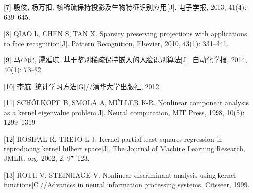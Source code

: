 \documentclass[bachelor,zhspacing]{cqu}  %
\begin{document}
\hypertarget{ref-ux6bb7ux4fca2013ux6838ux7a00ux758fux4fddux6301ux6295ux5f71ux53caux751fux7269ux7279ux5f81ux8bc6ux522bux5e94ux7528}{}
{[}7{]} 殷俊, 杨万扣. 核稀疏保持投影及生物特征识别应用{[}J{]}. 电子学报,
2013, 41(4): 639--645.

\hypertarget{ref-qiao2010sparsity}{}
{[}8{]} QIAO L, CHEN S, TAN X. Sparsity preserving projections with
applications to face recognition{[}J{]}. Pattern Recognition, Elsevier,
2010, 43(1): 331--341.

\hypertarget{ref-ux9a6cux5c0fux864e2014ux57faux4e8eux9274ux522bux7a00ux758fux4fddux6301ux5d4cux5165ux7684ux4ebaux8138ux8bc6ux522bux7b97ux6cd5}{}
{[}9{]} 马小虎, 谭延琪. 基于鉴别稀疏保持嵌入的人脸识别算法{[}J{]}.
自动化学报, 2014, 40(1): 73--82.

\hypertarget{ref-ux674eux822a2012ux7edfux8ba1ux5b66ux4e60ux65b9ux6cd57.3}{}
{[}10{]} 李航. 统计学习方法{[}G{]}//清华大学出版社, 2012.

\hypertarget{ref-scholkopf1998nonlinear}{}
{[}11{]} SCHÖLKOPF B, SMOLA A, MÜLLER K-R. Nonlinear component analysis
as a kernel eigenvalue problem{[}J{]}. Neural computation, MIT Press,
1998, 10(5): 1299--1319.

\hypertarget{ref-rosipal2002kernel}{}
{[}12{]} ROSIPAL R, TREJO L J. Kernel partial least squares regression
in reproducing kernel hilbert space{[}J{]}. The Journal of Machine
Learning Research, JMLR. org, 2002, 2: 97--123.

\hypertarget{ref-roth1999nonlinear}{}
{[}13{]} ROTH V, STEINHAGE V. Nonlinear discriminant analysis using
kernel functions{[}C{]}//Advances in neural information processing
systems. Citeseer, 1999.

%




\end{document}
